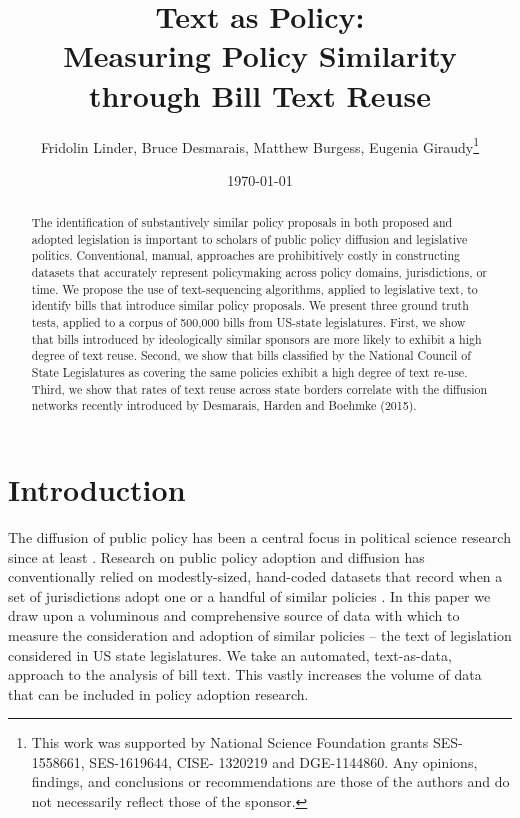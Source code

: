 \documentclass[12pt]{article} %
\begin{document}
 


\title{Text as Policy: \\ Measuring Policy Similarity through Bill Text Reuse}
\date{\today}
\author{Fridolin Linder, Bruce Desmarais, Matthew Burgess, Eugenia
Giraudy\footnote{This work was supported by National Science Foundation grants
SES-1558661, SES-1619644, CISE-
1320219 and DGE-1144860. Any opinions, findings, and conclusions or
recommendations are those of the
authors and do not necessarily reflect those of the sponsor.}}

\maketitle




\singlespacing
\begin{abstract} 
    \noindent The identification of substantively similar policy proposals in both proposed and adopted legislation is important to scholars of public policy diffusion and legislative politics. Conventional, manual, approaches are prohibitively costly in constructing datasets that accurately represent policymaking across policy domains, jurisdictions, or time. We propose the use of text-sequencing algorithms, applied to legislative text, to identify bills that introduce similar policy proposals. We present three ground truth tests, applied to a corpus of 500,000 bills from US-state legislatures. First, we show that bills introduced by ideologically similar sponsors are more likely to exhibit a high degree of text reuse. Second, we show that bills classified by the National Council of State Legislatures as covering the same policies exhibit a high degree of text re-use. Third, we show that rates of text reuse across state borders correlate with the diffusion networks recently introduced by Desmarais, Harden and Boehmke (2015).

\end{abstract}

\doublespacing
\clearpage


\section{Introduction} 

The diffusion of public policy has been a central focus in political science research since at least \citet{walker1969}. Research on public policy adoption and diffusion has conventionally relied on modestly-sized, hand-coded datasets that record when a set of jurisdictions adopt one or a handful of similar policies \citep{boehmke2012}. In this paper we draw upon a voluminous and comprehensive source of data with which to measure the consideration and adoption of similar policies -- the text of legislation considered in US state legislatures. We take an automated, text-as-data, approach to the analysis of bill text. This vastly increases the volume of data that can be included in policy adoption research. 
\end{document}
